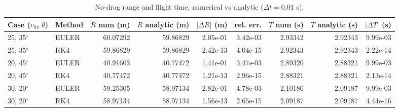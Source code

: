\begin{table}[h]
\centering\small
\begin{tabular}{llrrrrrrr}
\hline
Case ($v_0$, $\theta$) & Method & $R$ num (m) & $R$ analytic (m) & $|\Delta R|$ (m) & rel. err. & $T$ num (s) & $T$ analytic (s) & $|\Delta T|$ (s) \\
\hline
25, 35$^\circ$ & EULER & 60.07292 & 59.86829 & 2.05e-01 & 3.42e-03 & 2.93342 & 2.92343 & 9.99e-03 \\
25, 35$^\circ$ & RK4 & 59.86829 & 59.86829 & 2.42e-13 & 4.04e-15 & 2.92343 & 2.92343 & 2.22e-14 \\
20, 45$^\circ$ & EULER & 40.91603 & 40.77472 & 1.41e-01 & 3.47e-03 & 2.89320 & 2.88321 & 9.99e-03 \\
20, 45$^\circ$ & RK4 & 40.77472 & 40.77472 & 1.21e-13 & 2.96e-15 & 2.88321 & 2.88321 & 2.13e-14 \\
30, 20$^\circ$ & EULER & 59.25305 & 58.97134 & 2.82e-01 & 4.78e-03 & 2.10186 & 2.09187 & 9.99e-03 \\
30, 20$^\circ$ & RK4 & 58.97134 & 58.97134 & 1.56e-13 & 2.65e-15 & 2.09187 & 2.09187 & 4.44e-16 \\
\hline
\end{tabular}
\caption{No-drag range and flight time, numerical vs analytic ($\Delta t = 0.01$ s).}
\label{tab:no_drag_comparison}
\end{table}
